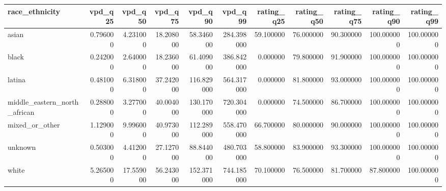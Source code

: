 \begin{tabular}{lrrrrrrrrrr}
\toprule
race_ethnicity & vpd_q25 & vpd_q50 & vpd_q75 & vpd_q90 & vpd_q99 & rating_q25 & rating_q50 & rating_q75 & rating_q90 & rating_q99 \\
\midrule
asian & 0.796000 & 4.231000 & 18.208000 & 58.346000 & 284.398000 & 59.100000 & 76.000000 & 90.300000 & 100.000000 & 100.000000 \\
black & 0.242000 & 2.640000 & 18.236000 & 61.409000 & 386.842000 & 0.000000 & 79.800000 & 91.900000 & 100.000000 & 100.000000 \\
latina & 0.481000 & 6.318000 & 37.242000 & 116.829000 & 564.317000 & 0.000000 & 81.800000 & 93.000000 & 100.000000 & 100.000000 \\
middle_eastern_north_african & 0.288000 & 3.277000 & 40.004000 & 130.170000 & 720.304000 & 0.000000 & 74.500000 & 86.700000 & 100.000000 & 100.000000 \\
mixed_or_other & 1.129000 & 9.996000 & 40.973000 & 112.289000 & 558.470000 & 66.700000 & 80.000000 & 90.000000 & 100.000000 & 100.000000 \\
unknown & 0.503000 & 4.412000 & 27.127000 & 88.844000 & 480.703000 & 58.800000 & 83.900000 & 93.300000 & 100.000000 & 100.000000 \\
white & 5.265000 & 17.559000 & 56.243000 & 152.371000 & 744.185000 & 70.100000 & 76.500000 & 81.700000 & 87.800000 & 100.000000 \\
\bottomrule
\end{tabular}
